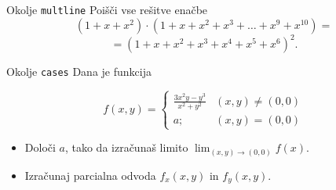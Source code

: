 \begin{frame}{Okolje \texttt{multline}}
	Poišči vse rešitve enačbe
	\[
	(1+x+x^2) \cdot (1+x+x^2+x^3+\ldots+x^9+x^{10}) =
	\]
	\[  
	=(1+x+x^2+x^3+x^4+x^5+x^6)^2.
	\]
\end{frame}

\begin{frame}{Okolje \texttt{cases}}
	Dana je funkcija
	
		\[
		f(x, y) =
		\begin{cases}
			\frac{3x^2y-y^3}{x^2+y^2} & (x,y) \neq (0,0) \\
			a;  & (x,y) = (0,0)
		\end{cases}
		\]
	\begin{itemize}
	\item Določi $a$, tako da izračunaš limito \( \lim_{(x,y)\to(0,0)} f(x). \)
	\item Izračunaj parcialna odvoda $f_x(x,y)$ in $f_y(x,y)$.
	\end{itemize}
\end{frame}
